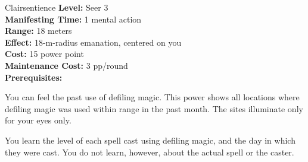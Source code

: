 {Clairsentience}
{
	\textbf{Level:}
	Seer 3\\
	\textbf{Manifesting Time:}
	1 mental action\\
	\textbf{Range:}
	18 meters\\
	\textbf{Effect:}
	18-m-radius emanation, centered on you\\
	\textbf{Cost:}
	15 power point\\
	\textbf{Maintenance Cost:}
	3 pp/round\\
	\textbf{Prerequisites:}
	\\
}
{
	You can feel the past use of defiling magic. This power shows all locations where defiling magic was used within range in the past month. The sites illuminate only for your eyes only.

	You learn the level of each spell cast using defiling magic, and the day in which they were cast. You do not learn, however, about the actual spell or the caster.
}